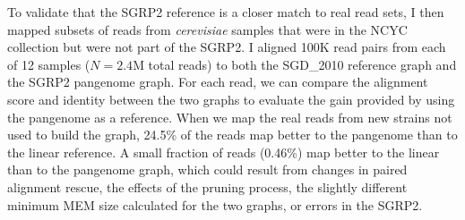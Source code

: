 To validate that the SGRP2 reference is a closer match to real read sets, I then mapped subsets of reads from \emph{cerevisiae} samples that were in the NCYC collection but were not part of the SGRP2.
I aligned 100K read pairs from each of 12 samples ($N=2.4$M total reads) to both the SGD\_2010 reference graph and the SGRP2 pangenome graph.
For each read, we can compare the alignment score and identity between the two graphs to evaluate the gain provided by using the pangenome as a reference.
When we map the real reads from new strains not used to build the graph, 24.5\% of the reads map better to the pangenome than to the linear reference.
A small fraction of reads (0.46\%) map better to the linear than to the pangenome graph, which could result from changes in paired alignment rescue, the effects of the pruning process, the slightly different minimum MEM size calculated for the two graphs, or errors in the SGRP2.

